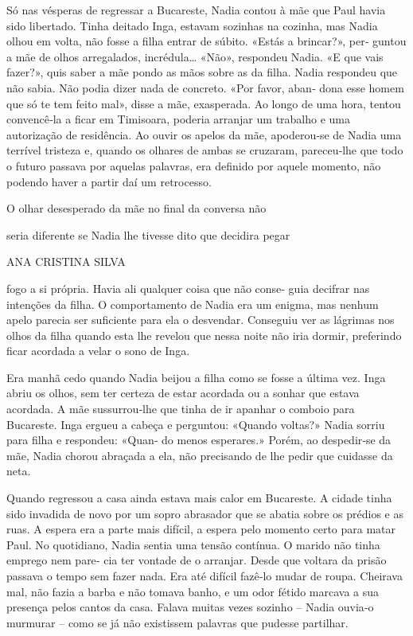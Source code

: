 Só nas vésperas de regressar a Bucareste, Nadia contou à mãe que Paul
havia sido libertado. Tinha deitado Inga, estavam sozinhas na cozinha,
mas Nadia olhou em volta, não fosse a filha entrar de súbito. «Estás a
brincar?», per‑ guntou a mãe de olhos arregalados, incrédula\ldots{}
«Não», respondeu Nadia. «E que vais fazer?», quis saber a mãe pondo as
mãos sobre as da filha. Nadia respondeu que não sabia. Não podia dizer
nada de concreto. «Por favor, aban‑ dona esse homem que só te tem feito
mal», disse a mãe, exasperada. Ao longo de uma hora, tentou convencê‑la
a ficar em Timisoara, poderia arranjar um trabalho e uma autorização de
residência. Ao ouvir os apelos da mãe, apoderou‑se de Nadia uma terrível
tristeza e, quando os olhares de ambas se cruzaram, pareceu‑lhe que todo
o futuro passava por aquelas palavras, era definido por aquele momento,
não podendo haver a partir daí um retrocesso.

O olhar desesperado da mãe no final da conversa não

seria diferente se Nadia lhe tivesse dito que decidira pegar

ANA CRISTINA SILVA

fogo a si própria. Havia ali qualquer coisa que não conse‑ guia decifrar
nas intenções da filha. O comportamento de Nadia era um enigma, mas
nenhum apelo parecia ser suficiente para ela o desvendar. Conseguiu ver
as lágrimas nos olhos da filha quando esta lhe revelou que nessa noite
não iria dormir, preferindo ficar acordada a velar o sono de Inga.

Era manhã cedo quando Nadia beijou a filha como se fosse a última vez.
Inga abriu os olhos, sem ter certeza de estar acordada ou a sonhar que
estava acordada. A mãe sussurrou‑lhe que tinha de ir apanhar o comboio
para Bucareste. Inga ergueu a cabeça e perguntou: «Quando voltas?» Nadia
sorriu para filha e respondeu: «Quan‑ do menos esperares.» Porém, ao
despedir‑se da mãe, Nadia chorou abraçada a ela, não precisando de lhe
pedir que cuidasse da neta.

Quando regressou a casa ainda estava mais calor em Bucareste. A cidade
tinha sido invadida de novo por um sopro abrasador que se abatia sobre
os prédios e as ruas. A espera era a parte mais difícil, a espera pelo
momento certo para matar Paul. No quotidiano, Nadia sentia uma tensão
contínua. O marido não tinha emprego nem pare‑ cia ter vontade de o
arranjar. Desde que voltara da prisão passava o tempo sem fazer nada.
Era até difícil fazê‑lo mudar de roupa. Cheirava mal, não fazia a barba
e não tomava banho, e um odor fétido marcava a sua presença pelos cantos
da casa. Falava muitas vezes sozinho -- Nadia ouvia‑o murmurar -- como
se já não existissem palavras que pudesse partilhar.

